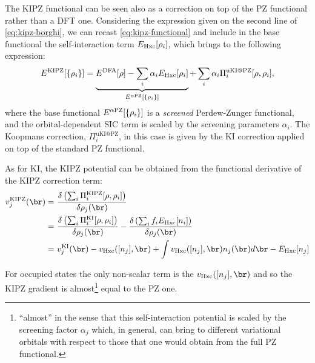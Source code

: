 The KIPZ functional can be seen also as a correction on top of the PZ functional rather than a DFT one. Considering the expression given on the second line of \cref{eq:kipz-borghi}, we can recast \cref{eq:kipz-functional} and include in the base functional the self-interaction term $E_{\rm Hxc}[\rho_i]$, which brings to the following expression:
%
\begin{equation}
    E^{\rm KIPZ}[\{\rho_i\}] = \underbrace{E^{\rm DFA}[\rho] - \sum_i \alpha_i E_{\rm Hxc}[\rho_i]}_{E^{\alpha\rm PZ}[\{\rho_i\}]} + \sum_i {\alpha_i} \Pi^{\text{uKI@PZ}}_i[\rho,\rho_i] ,
    \label{eq:kipz-as-ki-on-pz}
\end{equation}
%
where the base functional $E^{\alpha\rm PZ}[\{\rho_i\}]$ is a \emph{screened} Perdew-Zunger functional, and the orbital-dependent SIC term is scaled by the screening parameters $\alpha_i$. The Koopmans correction, $\Pi^{\text{uKI@PZ}}_i$, in this case is given by the KI correction applied on top of the standard PZ functional.

As for KI, the KIPZ potential can be obtained from the functional derivative of the KIPZ correction term:
%
\begin{equation}
    \begin{split}
        v^{\rm KIPZ}_j(\br) =\ &\frac{\delta \left( \sum_i \Pi^{\rm KIPZ}_i[\rho,\rho_i] \right)}{\delta \rho_j(\br)} \\
        =\ &\frac{\delta \left( \sum_i \Pi^{\text{KI}}_i[\rho,\rho_i] \right)}{\delta \rho_j(\br)} - 
        \frac{\delta \left( \sum_i f_i E_{\rm Hxc}[n_i] \right)}{\delta \rho_j(\br)} \\
        =\ &v^{\text{KI}}_j(\br) - v_{\rm Hxc}([n_j],\br) + \int v_{\rm Hxc}([n_j],\br) n_j(\br) d\br - E_{\rm Hxc}[n_j]
    \end{split}
    \label{eq:kipz-pot-full}
\end{equation}

For occupied states the only non-scalar term is the $v_{\rm Hxc}([n_j],\br)$ and so the KIPZ gradient is almost\footnote{``almost'' in the sense that this self-interaction potential is scaled by the screening factor $\alpha_j$ which, in general, can bring to different variational orbitals with respect to those that one would obtain from the full PZ functional.} equal to the PZ one.